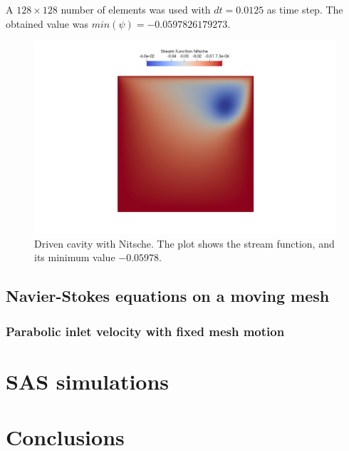 \documentclass[11pt,a4paper,titlepage]{report}
\begin{document}
A $128 \times 128$ number of elements was used with $dt = 0.0125$ as time step. The obtained value was $min(\psi) = -0.0597826179273$. 

\begin{figure}[ht]
\centering
\includegraphics[width=\textwidth]{images/stream_function_nitsche.png}
\vspace{-1cm}
\caption{Driven cavity with Nitsche. The plot shows the stream function, and its minimum value $-0.05978$.}
\end{figure}

\section{Navier-Stokes equations on a moving mesh}
\subsection{Parabolic inlet velocity with fixed mesh motion}

\chapter{SAS simulations}

\chapter{Conclusions}
\end{document}
